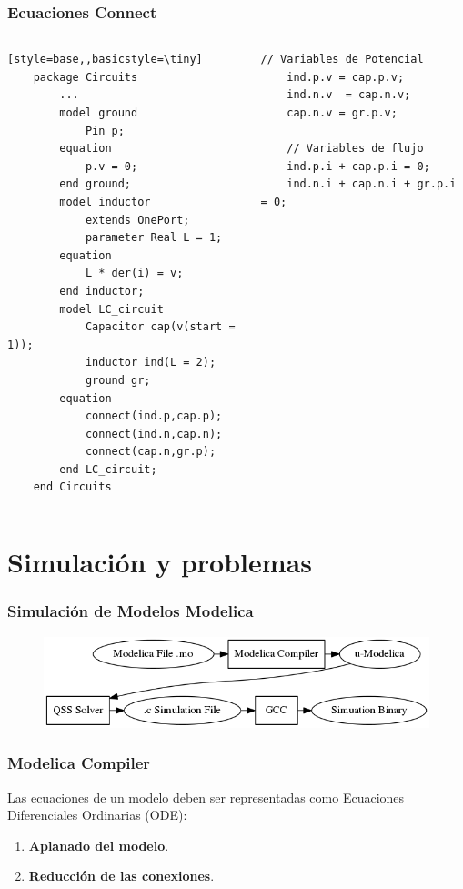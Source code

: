 \documentclass[aspectratio=169,10pt]{beamer}
\begin{document}
\begin{frame}[fragile]
\frametitle{Ecuaciones Connect} 
\begin{columns}  
\column[T]{8cm}
 \begin{lstlisting}[style=base,,basicstyle=\tiny]
    package Circuits
        ...
        model ground
            Pin p;
        equation
            p.v = 0;
        end ground;
        model inductor
            extends OnePort;
            parameter Real L = 1;
        equation
            L * der(i) = v;
        end inductor;
        model LC_circuit
            Capacitor cap(v(start = 1));
            inductor ind(L = 2);
            ground gr;
        equation
            connect(ind.p,cap.p);
            connect(ind.n,cap.n);
            connect(cap.n,gr.p);
        end LC_circuit;
    end Circuits
\end{lstlisting}
\column[T]{6cm}
 \begin{lstlisting}[style=base]
    // Variables de Potencial
    ind.p.v = cap.p.v;
    ind.n.v  = cap.n.v;
    cap.n.v = gr.p.v;
    
    // Variables de flujo
    ind.p.i + cap.p.i = 0;
    ind.n.i + cap.n.i + gr.p.i = 0;
\end{lstlisting}
\end{columns}
\end{frame}

\section{Simulación y problemas}

\begin{frame}[fragile]
\frametitle{Simulación de Modelos Modelica} 
    \begin{figure}
      \centering
      \includegraphics[scale=0.5]{Compilacion} 
      \label{fig:proceso}
    \end{figure}
\end{frame}


\begin{frame}[fragile]
\frametitle{Modelica Compiler} 
 Las ecuaciones de un modelo deben ser representadas como Ecuaciones Diferenciales Ordinarias (ODE): 
 \begin{enumerate}
 \item \textbf{Aplanado del modelo}.
 \item \textbf{Reducción de las conexiones}.
 \end{enumerate}
 
\end{frame}
\end{document}
